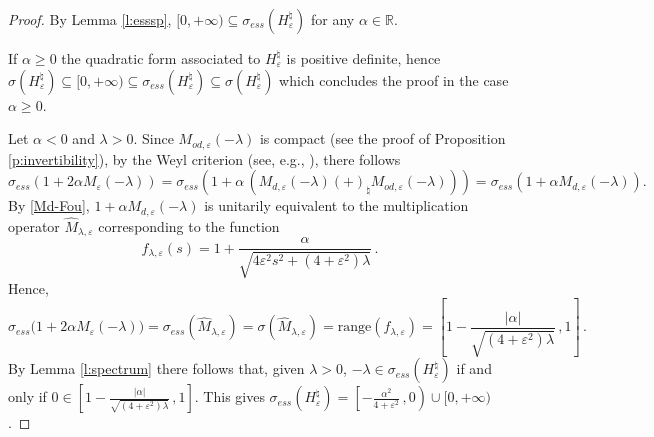 \documentclass[a4paper,11pt,reqno]{amsart}
\theoremstyle{definition}
\numberwithin{equation}{section}
\newcommand{\RE}{\mathbb R}
\newcommand{\ve}{\varepsilon}
\newcommand{\bosfer}{{\natural}}
\newcommand{\bosferpm}{{(+)}}
\begin{document}
\begin{proof} 
By Lemma \ref{l:esssp}, $[0,+\infty) \subseteq \sigma_{ess}(H^\bosfer_\ve)$ for any $\alpha\in \RE$. \par If $\alpha \geq 0$ the quadratic form associated to $H^\bosfer_\ve$ is positive definite, hence $\sigma(H^\bosfer_\ve)\subseteq [0,+\infty) \subseteq \sigma_{ess}(H^\bosfer_\ve)\subseteq\sigma(H^\bosfer_\ve)$ which concludes the proof in the case $\alpha\geq 0$.

    Let $ \alpha<0$ and $\lambda>0$. Since $M_{od,\ve}(-\lambda)$ is compact (see the proof of Proposition \ref{p:invertibility}), by the Weyl criterion (see, e.g., \cite[Lemma 3 in Section XIII.4]{ReSi}), there follows  
    \[
    \sigma_{ess}(1+ 2\alpha M_\ve(-\lambda)) = 
    \sigma_{ess}(1+ \alpha\,(M_{d,\ve}(-\lambda)\bosferpm_\bosfer M_{od,\ve}(-\lambda)))
    =\sigma_{ess}(1+ \alpha M_{d,\ve}(-\lambda)). 
    \]
    By \eqref{Md-Fou},   $1+\alpha M_{d,\ve}(-\lambda)$ is unitarily equivalent to the multiplication operator $\widehat M_{\lambda,\ve}$ corresponding to the function 
    \[f_{\lambda,\ve}(s)=1+\frac{\alpha}{\sqrt{4\ve^2s^2+(4+\ve^{2})\lambda}}\,.
    \] 
    Hence,
    \[
          \sigma_{ess}\big(1+2\alpha M_\ve(-\lambda)\big) =\sigma_{ess}(\widehat M_{\lambda,\ve})=\sigma(\widehat M_{\lambda,\ve})=\text{range}(f_{\lambda,\ve})=
   \left[1-\frac{|\alpha|}{\sqrt{(4+\ve^{2})\lambda}}\,,1\right]\,.
   \]     
        By Lemma \ref{l:spectrum} there follows that, given $\lambda>0$, $-\lambda \in \sigma_{ess}(H^\bosfer_\ve)$ if and only if $0\in \left[1-\frac{|\alpha|}{\sqrt{(4+\ve^{2})\lambda}}\,,1\right]$. This gives $\sigma_{ess}(H^\bosfer_\ve)=\left[-\frac{\alpha^2}{4+\ve^{2}}\,,0\right)\cup[0,+\infty)$. 
\end{proof}
\end{document}

